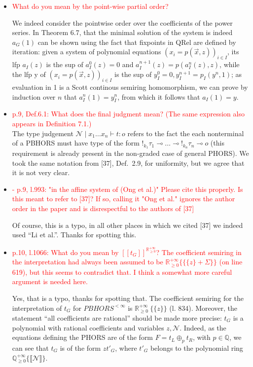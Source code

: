\documentclass[a4paper,10pt]{article}
\newcommand{\red}[1]{\textcolor{red}{#1}}
\begin{document}
\begin{itemize}
\begin{itemize}
	\item \red{What do you mean by the point-wise partial order?}
	
	We indeed consider the pointwise order over the coefficients of the power series. 
	In Theorem 6.7, that the minimal solution of the system is indeed $a_G(1)$ can be shown using the fact that fixpoints in QRel are defined by iteration: given a system of polynomial equations $(x_i=p(\vec x,z))_{i \in I}$, its lfp $a_I(z)$ is the sup of $a_I^0(z)=0$ and $a_I^{n+1}(z)=p(a_I^n(z),z)$, while
	the lfp y of $(x_i=p(\vec x,z))_{i \in I}$ is the sup of $y_I^0=0, y_I^{n+1}=p_I(y^n,1)$; as evaluation in 1 is a Scott continous semiring homomorphism, we can prove by induction over $n$ that $a_I^{n}(1)=y_I^n$, from which it follows that $a_I(1)=y$.
	
		\item\red{ p.9, Def.6.1: What does the final judgment mean? (The same expression also appears in Definition 7.1.)}\\
	The type judgement $\mathcal{N} \mid x_1 \dots x_n \vdash t: o$ refers to the fact the each nonterminal of a PBHORS must have type of the form $!_{k_1}\tau_1  \multimap \dots \multimap !_{k_n } \tau_n \multimap o $ (this requirement is already present in the non-graded case of general PHORS). We took the same notation from [37], Def.~2.9, for uniformity, but we agree that it is not very clear.
	
	\item \red{- p.9, l.993: "in the affine system of (Ong et al.)" Please cite this properly. Is this meant to refer to [37]? If so, calling it "Ong et al." ignores the author order in the paper and is disrespectful to the authors of [37]}
	
	Of course, this is a typo, in all other places in which we cited [37] we indeed used ``Li et al.''. Thanks for spotting this.
	
	\item\red{p.10, l.1066: What do you mean by $ [\![t_G]\!]^{\mathbb{R}^{+\infty}_{\ge 0}} $? The coefficient semiring in the interpretation had always been assumed to be $ \mathbb{R}^{+\infty}_{\ge 0}\{\{ \{z\} + \Sigma \}\} $ (on line 619), but this seems to contradict that. I think a somewhat more careful argument is needed here.}
	
Yes, that is a typo, thanks for spotting that. The coefficient semiring for the interpretation of $t_G$ for $PBHORS^{<\infty}$ is $\mathbb{R}^{+\infty}_{\ge 0}\ \{\{z\}\}$ (l. 834). Moreover, the statement ``all coefficients are rational'' should be made more precise: 
 $t_G$ is a polynomial with rational coefficients and variables $z, \mathcal{N}$. Indeed, as the equations defining the PHORS are of the form $F = t_L \oplus_p t_R$, with $p \in \mathbb{Q}$, we can see that $t_G$ is of the form $ zt'_G$, where $t'_G$ belongs to the polynomial ring $ \mathbb{Q}^{+\infty}_{\ge 0} \{\llbracket \mathcal{N} \rrbracket \} $.	


\end{itemize}
\end{itemize}
\end{document}
